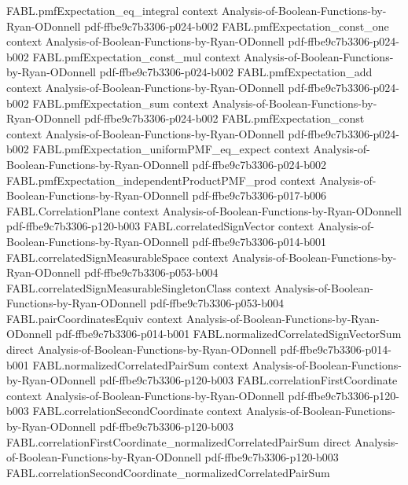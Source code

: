 \begin{theorem}
\proofstep
  {FABL.pmfExpectation_eq_integral}
  {context}
  {Analysis-of-Boolean-Functions-by-Ryan-ODonnell}
  {pdf-ffbe9c7b3306-p024-b002}
\proofstep
  {FABL.pmfExpectation_const_one}
  {context}
  {Analysis-of-Boolean-Functions-by-Ryan-ODonnell}
  {pdf-ffbe9c7b3306-p024-b002}
\proofstep
  {FABL.pmfExpectation_const_mul}
  {context}
  {Analysis-of-Boolean-Functions-by-Ryan-ODonnell}
  {pdf-ffbe9c7b3306-p024-b002}
\proofstep
  {FABL.pmfExpectation_add}
  {context}
  {Analysis-of-Boolean-Functions-by-Ryan-ODonnell}
  {pdf-ffbe9c7b3306-p024-b002}
\proofstep
  {FABL.pmfExpectation_sum}
  {context}
  {Analysis-of-Boolean-Functions-by-Ryan-ODonnell}
  {pdf-ffbe9c7b3306-p024-b002}
\proofstep
  {FABL.pmfExpectation_const}
  {context}
  {Analysis-of-Boolean-Functions-by-Ryan-ODonnell}
  {pdf-ffbe9c7b3306-p024-b002}
\proofstep
  {FABL.pmfExpectation_uniformPMF_eq_expect}
  {context}
  {Analysis-of-Boolean-Functions-by-Ryan-ODonnell}
  {pdf-ffbe9c7b3306-p024-b002}
\proofstep
  {FABL.pmfExpectation_independentProductPMF_prod}
  {context}
  {Analysis-of-Boolean-Functions-by-Ryan-ODonnell}
  {pdf-ffbe9c7b3306-p017-b006}
\proofstep
  {FABL.CorrelationPlane}
  {context}
  {Analysis-of-Boolean-Functions-by-Ryan-ODonnell}
  {pdf-ffbe9c7b3306-p120-b003}
\proofstep
  {FABL.correlatedSignVector}
  {context}
  {Analysis-of-Boolean-Functions-by-Ryan-ODonnell}
  {pdf-ffbe9c7b3306-p014-b001}
\proofstep
  {FABL.correlatedSignMeasurableSpace}
  {context}
  {Analysis-of-Boolean-Functions-by-Ryan-ODonnell}
  {pdf-ffbe9c7b3306-p053-b004}
\proofstep
  {FABL.correlatedSignMeasurableSingletonClass}
  {context}
  {Analysis-of-Boolean-Functions-by-Ryan-ODonnell}
  {pdf-ffbe9c7b3306-p053-b004}
\proofstep
  {FABL.pairCoordinatesEquiv}
  {context}
  {Analysis-of-Boolean-Functions-by-Ryan-ODonnell}
  {pdf-ffbe9c7b3306-p014-b001}
\proofstep
  {FABL.normalizedCorrelatedSignVectorSum}
  {direct}
  {Analysis-of-Boolean-Functions-by-Ryan-ODonnell}
  {pdf-ffbe9c7b3306-p014-b001}
\proofstep
  {FABL.normalizedCorrelatedPairSum}
  {context}
  {Analysis-of-Boolean-Functions-by-Ryan-ODonnell}
  {pdf-ffbe9c7b3306-p120-b003}
\proofstep
  {FABL.correlationFirstCoordinate}
  {context}
  {Analysis-of-Boolean-Functions-by-Ryan-ODonnell}
  {pdf-ffbe9c7b3306-p120-b003}
\proofstep
  {FABL.correlationSecondCoordinate}
  {context}
  {Analysis-of-Boolean-Functions-by-Ryan-ODonnell}
  {pdf-ffbe9c7b3306-p120-b003}
\proofstep
  {FABL.correlationFirstCoordinate_normalizedCorrelatedPairSum}
  {direct}
  {Analysis-of-Boolean-Functions-by-Ryan-ODonnell}
  {pdf-ffbe9c7b3306-p120-b003}
\proofstep
  {FABL.correlationSecondCoordinate_normalizedCorrelatedPairSum}

\end{theorem}

